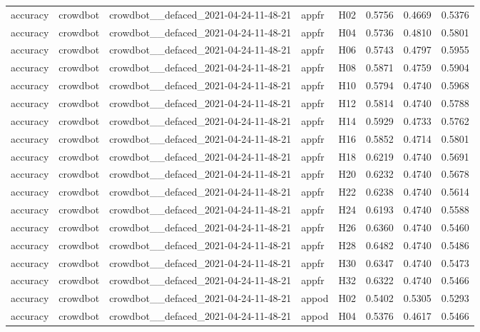 \begin{table}[tbp]
\begin{tabular}{lllllrrr}
accuracy & crowdbot & crowdbot\_\_defaced\_2021-04-24-11-48-21 & appfr & H02 & 0.5756 & 0.4669 & 0.5376 \\
accuracy & crowdbot & crowdbot\_\_defaced\_2021-04-24-11-48-21 & appfr & H04 & 0.5736 & 0.4810 & 0.5801 \\
accuracy & crowdbot & crowdbot\_\_defaced\_2021-04-24-11-48-21 & appfr & H06 & 0.5743 & 0.4797 & 0.5955 \\
accuracy & crowdbot & crowdbot\_\_defaced\_2021-04-24-11-48-21 & appfr & H08 & 0.5871 & 0.4759 & 0.5904 \\
accuracy & crowdbot & crowdbot\_\_defaced\_2021-04-24-11-48-21 & appfr & H10 & 0.5794 & 0.4740 & 0.5968 \\
accuracy & crowdbot & crowdbot\_\_defaced\_2021-04-24-11-48-21 & appfr & H12 & 0.5814 & 0.4740 & 0.5788 \\
accuracy & crowdbot & crowdbot\_\_defaced\_2021-04-24-11-48-21 & appfr & H14 & 0.5929 & 0.4733 & 0.5762 \\
accuracy & crowdbot & crowdbot\_\_defaced\_2021-04-24-11-48-21 & appfr & H16 & 0.5852 & 0.4714 & 0.5801 \\
accuracy & crowdbot & crowdbot\_\_defaced\_2021-04-24-11-48-21 & appfr & H18 & 0.6219 & 0.4740 & 0.5691 \\
accuracy & crowdbot & crowdbot\_\_defaced\_2021-04-24-11-48-21 & appfr & H20 & 0.6232 & 0.4740 & 0.5678 \\
accuracy & crowdbot & crowdbot\_\_defaced\_2021-04-24-11-48-21 & appfr & H22 & 0.6238 & 0.4740 & 0.5614 \\
accuracy & crowdbot & crowdbot\_\_defaced\_2021-04-24-11-48-21 & appfr & H24 & 0.6193 & 0.4740 & 0.5588 \\
accuracy & crowdbot & crowdbot\_\_defaced\_2021-04-24-11-48-21 & appfr & H26 & 0.6360 & 0.4740 & 0.5460 \\
accuracy & crowdbot & crowdbot\_\_defaced\_2021-04-24-11-48-21 & appfr & H28 & 0.6482 & 0.4740 & 0.5486 \\
accuracy & crowdbot & crowdbot\_\_defaced\_2021-04-24-11-48-21 & appfr & H30 & 0.6347 & 0.4740 & 0.5473 \\
accuracy & crowdbot & crowdbot\_\_defaced\_2021-04-24-11-48-21 & appfr & H32 & 0.6322 & 0.4740 & 0.5466 \\
accuracy & crowdbot & crowdbot\_\_defaced\_2021-04-24-11-48-21 & appod & H02 & 0.5402 & 0.5305 & 0.5293 \\
accuracy & crowdbot & crowdbot\_\_defaced\_2021-04-24-11-48-21 & appod & H04 & 0.5376 & 0.4617 & 0.5466 \\

\end{tabular}
\end{table}
